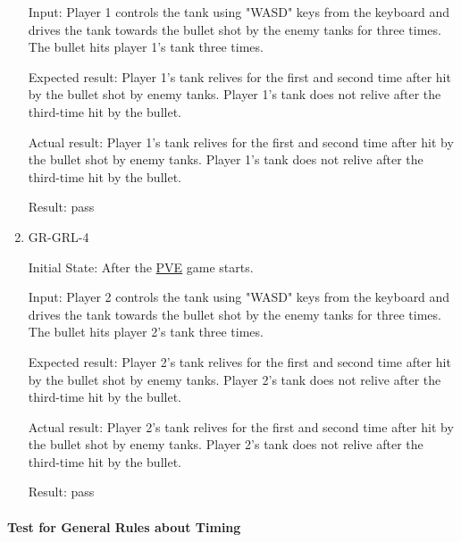 \documentclass[12pt, titlepage]{article}
\begin{document}
\begin{enumerate}
Input: Player 1 controls the tank using "WASD" keys from the keyboard and drives the tank towards the bullet shot by the enemy tanks for three times. The bullet hits player 1's tank three times.
					
Expected result: Player 1's tank relives for the first and second time after hit by the bullet shot by enemy tanks. Player 1's tank does not relive after the third-time hit by the bullet.
					
Actual result: Player 1's tank relives for the first and second time after hit by the bullet shot by enemy tanks. Player 1's tank does not relive after the third-time hit by the bullet.

Result: pass

\item{GR-GRL-4\\}
					
Initial State: After the \underline{PVE} game starts.
					
Input: Player 2 controls the tank using "WASD" keys from the keyboard and drives the tank towards the bullet shot by the enemy tanks for three times. The bullet hits player 2's tank three times.
					
Expected result: Player 2's tank relives for the first and second time after hit by the bullet shot by enemy tanks. Player 2's tank does not relive after the third-time hit by the bullet.
					
Actual result: Player 2's tank relives for the first and second time after hit by the bullet shot by enemy tanks. Player 2's tank does not relive after the third-time hit by the bullet.

Result: pass

\end{enumerate}

\paragraph{Test for General Rules about Timing}
\end{document}
